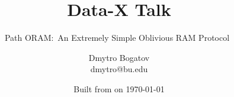 

\ifnotes%
\fi

\title{Data-X Talk} %

\subtitle{Path ORAM:\ An Extremely Simple Oblivious RAM Protocol~\cite{DBLP:journals/corr/abs-1202-5150}}

\date{Built from \href{https://git.dbogatov.org/bu/PathORAM-Talk/commit/\version}{\emph{\version}} on \today}

\author{Dmytro Bogatov \\ dmytro@bu.edu}



\makeatletter
\def\beamer@framenotesbegin{%
	\usebeamercolor[fg]{normal text} 
		\gdef\beamer@noteitems{}%
		\gdef\beamer@notes{}%
}
\makeatother


\newcommand{\BigO}[1]{\mathcal{O}\left(#1\right)}
\newcommand{\RAM}{\textbf{RAM}}
